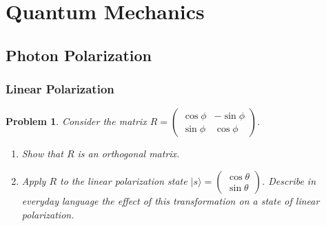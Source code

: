 \documentclass[12pt]{article}
\newtheorem{problem}{Problem}
\theoremstyle{remark}  %
\begin{document}
\setlength{\abovecaptionskip}{0pt} %

\rhead{\today}

\section{Quantum Mechanics}
\subsection{Photon Polarization}
\subsubsection{Linear Polarization}
    \begin{problem}
        Consider the matrix $R=\begin{pmatrix}
            \cos\phi & -\sin\phi \\
            \sin\phi & \cos\phi
        \end{pmatrix}$.
        \begin{enumerate}[label=(\alph*)]
            \item Show that $R$ is an orthogonal matrix.
            \item Apply $R$ to the linear polarization state $|s\rangle = \begin{pmatrix}
                \cos\theta \\
                \sin\theta
            \end{pmatrix}$. Describe in everyday language the effect of this transformation on a state of linear polarization.
        \end{enumerate}
    \end{problem}
\end{document}
